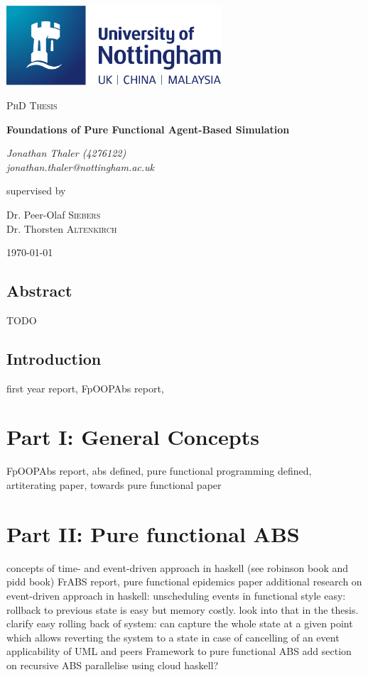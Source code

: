 \documentclass[oneside]{book}
\begin{document}
\begin{titlepage}
	\centering
	\includegraphics[width=0.60\textwidth]{../logo/UoN_Primary_Logo_RGB.png}\par\vspace{1cm}
	{\scshape\Large PhD Thesis\par}
	\vspace{1.5cm}
	{\huge\bfseries Foundations of Pure Functional Agent-Based Simulation\par}
	\vspace{2cm}
	{\Large\itshape Jonathan Thaler (4276122) \\ jonathan.thaler@nottingham.ac.uk \par}
	\vfill
	supervised by\par
	Dr. Peer-Olaf \textsc{Siebers} \\
	Dr. Thorsten \textsc{Altenkirch}

	\vfill

	{\large \today\par}
\end{titlepage}

\cleardoublepage

\section*{Abstract}
TODO

\clearpage
\tableofcontents
\clearpage

\section{Introduction}
first year report,
FpOOPAbs report,

\chapter*{Part I: General Concepts}
FpOOPAbs report,
abs defined,
pure functional programming defined,
artiterating paper,
towards pure functional paper

\chapter{Part II: Pure functional ABS}
concepts of time- and event-driven approach in haskell (see robinson book and pidd book)
FrABS report,
pure functional epidemics paper
additional research on event-driven approach in haskell: unscheduling events in functional style easy: rollback to previous state is easy but memory costly. look into that in the thesis. clarify easy rolling back of system: can capture the whole state at a given point which allows reverting the system to a state in case of cancelling of an event
applicability of UML and peers Framework to pure functional ABS 
add section on recursive ABS
parallelise using cloud haskell?
\end{document}
